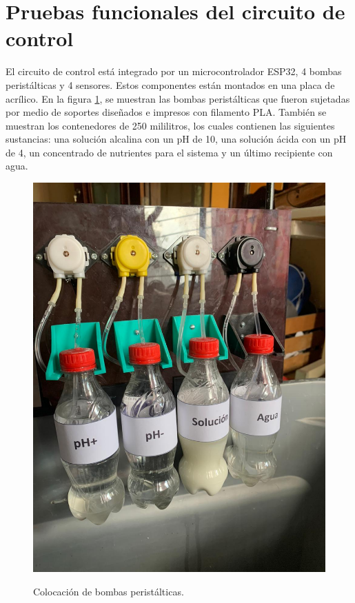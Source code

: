 \section{Pruebas funcionales del circuito de control}
El circuito de control está integrado por un microcontrolador ESP32, 4 bombas peristálticas y 4 sensores. Estos componentes están montados en una placa de acrílico. En la figura \ref{Peris}, se muestran las bombas peristálticas que fueron sujetadas por medio de soportes diseñados e impresos con filamento PLA. También se muestran los contenedores de 250 mililitros, los cuales contienen las siguientes sustancias: una solución alcalina con un pH de 10, una solución ácida con un pH de 4, un concentrado de nutrientes para el sistema y un último recipiente con agua.
 \begin{figure}[H]
\centering
         \includegraphics[scale=0.23]{imgs/perisss.jpg} \\
    \caption{Colocación de bombas peristálticas. }\label{Peris}
\end{figure}

